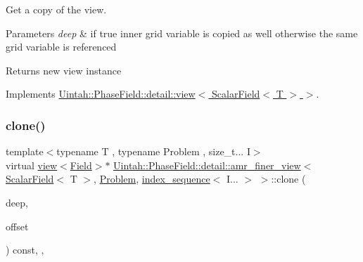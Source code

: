 Get a copy of the view. 


\begin{DoxyParams}{Parameters}
{\em deep} & if true inner grid variable is copied as well otherwise the same grid variable is referenced\\
\hline
\end{DoxyParams}
\begin{DoxyReturn}{Returns}
new view instance 
\end{DoxyReturn}


Implements \hyperlink{classUintah_1_1PhaseField_1_1detail_1_1view_3_01ScalarField_3_01T_01_4_01_4_a6e11243c9d776a7b703e524ea4151a16}{Uintah\+::\+Phase\+Field\+::detail\+::view$<$ Scalar\+Field$<$ T $>$ $>$}.

\mbox{\label{classUintah_1_1PhaseField_1_1detail_1_1amr__finer__view_3_01ScalarField_3_01T_01_4_00_01Problem_810ae3f886a4d3bdb2b37c629369a2ec_afae4d2b27a016b9f84d795d3e698608f}} 
\subsubsection{\texorpdfstring{clone()}{clone()}\hspace{0.1cm}{\footnotesize\ttfamily [2/2]}}
{\footnotesize\ttfamily template$<$typename T , typename Problem , size\+\_\+t... I$>$ \\
virtual \hyperlink{classUintah_1_1PhaseField_1_1detail_1_1view}{view}$<$\hyperlink{structUintah_1_1PhaseField_1_1ScalarField}{Field}$>$$\ast$ \hyperlink{classUintah_1_1PhaseField_1_1detail_1_1amr__finer__view}{Uintah\+::\+Phase\+Field\+::detail\+::amr\+\_\+finer\+\_\+view}$<$ \hyperlink{structUintah_1_1PhaseField_1_1ScalarField}{Scalar\+Field}$<$ T $>$, \hyperlink{classUintah_1_1PhaseField_1_1Problem}{Problem}, \hyperlink{namespaceUintah_1_1PhaseField_a237de804d99512e50613aff7c94a9461}{index\+\_\+sequence}$<$ I... $>$ $>$\+::clone (\begin{DoxyParamCaption}\item[{bool}]{deep,  }\item[{const Int\+Vector \&}]{offset }\end{DoxyParamCaption}) const\hspace{0.3cm}{\ttfamily [inline]}, {\ttfamily [override]}, {\ttfamily [virtual]}}



